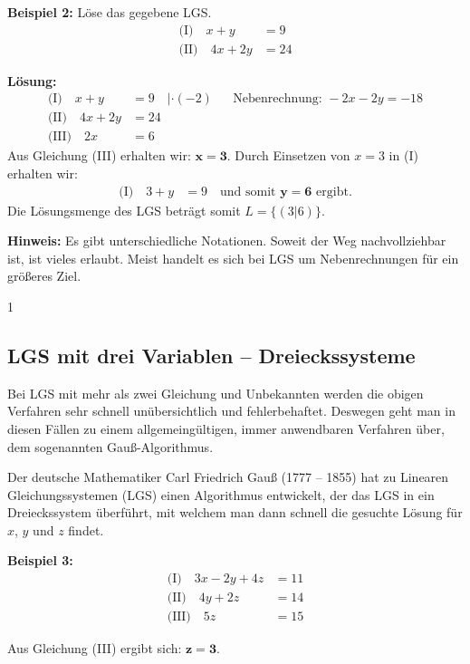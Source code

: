\documentclass{article}
\begin{document}
\textbf{Beispiel 2:} Löse das gegebene LGS.
\begin{align*}
\text{(I)} \quad x + y &= 9\\
\text{(II)} \quad 4x + 2y &= 24
\end{align*}

\textbf{Lösung:}
\begin{align*}
\text{(I)} \quad x + y &= 9 \quad |\cdot (-2) && \text{Nebenrechnung: } -2x - 2y = -18\\
\text{(II)} \quad 4x + 2y &= 24\\
\text{(III)} \quad 2x &= 6
\end{align*}
Aus Gleichung (III) erhalten wir: $\mathbf{x = 3}$. Durch Einsetzen von $x = 3$ in (I) erhalten wir:
\begin{align*}
\text{(I)} \quad 3 + y &= 9 \quad \text{und somit } \mathbf{y = 6} \text{ ergibt.}
\end{align*}
Die Lösungsmenge des LGS beträgt somit $L = \{(3|6)\}$.

\textbf{Hinweis:} Es gibt unterschiedliche Notationen. Soweit der Weg nachvollziehbar ist, ist vieles erlaubt. Meist handelt es sich bei LGS um Nebenrechnungen für ein größeres Ziel.

\hfill 1

\newpage

\subsection{LGS mit drei Variablen – Dreieckssysteme}

Bei LGS mit mehr als zwei Gleichung und Unbekannten werden die obigen Verfahren sehr schnell unübersichtlich und fehlerbehaftet. Deswegen geht man in diesen Fällen zu einem allgemeingültigen, immer anwendbaren Verfahren über, dem sogenannten Gauß-Algorithmus.

Der deutsche Mathematiker Carl Friedrich Gauß (1777 – 1855) hat zu Linearen Gleichungssystemen (LGS) einen Algorithmus entwickelt, der das LGS in ein Dreieckssystem überführt, mit welchem man dann schnell die gesuchte Lösung für $x$, $y$ und $z$ findet.

\textbf{Beispiel 3:}
\begin{align*}
\text{(I)} \quad 3x - 2y + 4z &= 11\\
\text{(II)} \quad 4y + 2z &= 14\\
\text{(III)} \quad 5z &= 15
\end{align*}

Aus Gleichung (III) ergibt sich: $\mathbf{z = 3}$.
\end{document}
